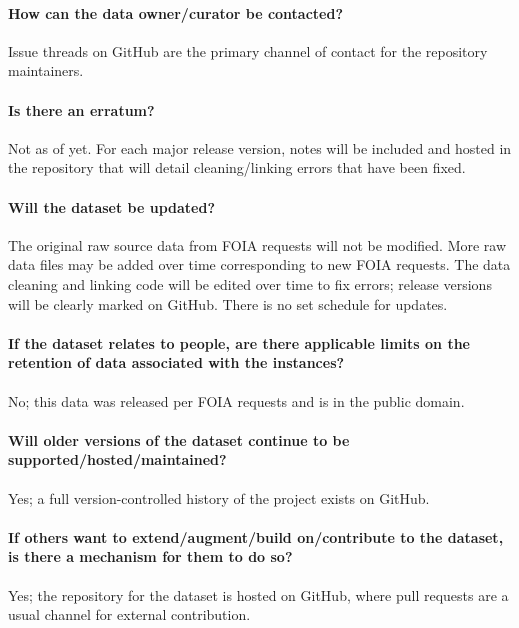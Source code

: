 \paragraph{How can the data owner/curator be contacted?}
Issue threads on GitHub are the primary channel of contact for the repository maintainers.

\paragraph{Is there an erratum?}
Not as of yet. For each major release version, notes will be included and
hosted in the repository that will detail cleaning/linking errors that have been fixed.

\paragraph{Will the dataset be updated?}
The original raw source data from FOIA requests will not be modified. More raw
data files may be added over time corresponding to new FOIA requests. The data
cleaning and linking code will be edited over time to fix errors; release
versions will be clearly marked on GitHub. There is no set schedule for updates.

\paragraph{If the dataset relates to people, are there applicable limits on the retention of data associated with the instances?}
No; this data was released per FOIA requests and is in the public domain.

\paragraph{Will older versions of the dataset continue to be supported/hosted/maintained?}
Yes; a full version-controlled history of the project exists on GitHub.

\paragraph{If others want to extend/augment/build on/contribute to the dataset, is there a mechanism for them to do so?}
Yes; the repository for the dataset is hosted on GitHub, where pull requests are a usual channel for external contribution.
